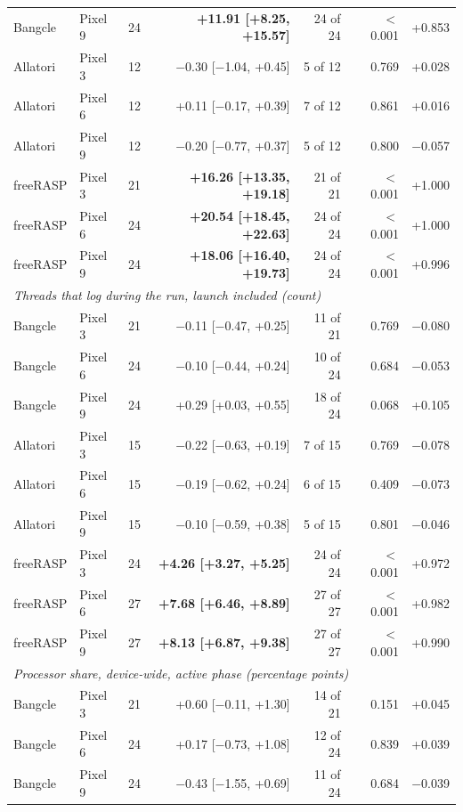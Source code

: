 \begin{table}[t]
\begin{tabular}{llrrrrr}
Bangcle & Pixel 9 & 24 & \textbf{+11.91 [+8.25, +15.57]} & 24 of 24 & $<$ 0.001 & +0.853 \\
Allatori & Pixel 3 & 12 & $-$0.30 [$-$1.04, +0.45] & 5 of 12 & 0.769 & +0.028 \\
Allatori & Pixel 6 & 12 & +0.11 [$-$0.17, +0.39] & 7 of 12 & 0.861 & +0.016 \\
Allatori & Pixel 9 & 12 & $-$0.20 [$-$0.77, +0.37] & 5 of 12 & 0.800 & $-$0.057 \\
freeRASP & Pixel 3 & 21 & \textbf{+16.26 [+13.35, +19.18]} & 21 of 21 & $<$ 0.001 & +1.000 \\
freeRASP & Pixel 6 & 24 & \textbf{+20.54 [+18.45, +22.63]} & 24 of 24 & $<$ 0.001 & +1.000 \\
freeRASP & Pixel 9 & 24 & \textbf{+18.06 [+16.40, +19.73]} & 24 of 24 & $<$ 0.001 & +0.996 \\
\midrule
\multicolumn{7}{l}{\textit{Threads that log during the run, launch included (count)}} \\
Bangcle & Pixel 3 & 21 & $-$0.11 [$-$0.47, +0.25] & 11 of 21 & 0.769 & $-$0.080 \\
Bangcle & Pixel 6 & 24 & $-$0.10 [$-$0.44, +0.24] & 10 of 24 & 0.684 & $-$0.053 \\
Bangcle & Pixel 9 & 24 & +0.29 [+0.03, +0.55] & 18 of 24 & 0.068 & +0.105 \\
Allatori & Pixel 3 & 15 & $-$0.22 [$-$0.63, +0.19] & 7 of 15 & 0.769 & $-$0.078 \\
Allatori & Pixel 6 & 15 & $-$0.19 [$-$0.62, +0.24] & 6 of 15 & 0.409 & $-$0.073 \\
Allatori & Pixel 9 & 15 & $-$0.10 [$-$0.59, +0.38] & 5 of 15 & 0.801 & $-$0.046 \\
freeRASP & Pixel 3 & 24 & \textbf{+4.26 [+3.27, +5.25]} & 24 of 24 & $<$ 0.001 & +0.972 \\
freeRASP & Pixel 6 & 27 & \textbf{+7.68 [+6.46, +8.89]} & 27 of 27 & $<$ 0.001 & +0.982 \\
freeRASP & Pixel 9 & 27 & \textbf{+8.13 [+6.87, +9.38]} & 27 of 27 & $<$ 0.001 & +0.990 \\
\midrule
\multicolumn{7}{l}{\textit{Processor share, device-wide, active phase (percentage points)}} \\
Bangcle & Pixel 3 & 21 & +0.60 [$-$0.11, +1.30] & 14 of 21 & 0.151 & +0.045 \\
Bangcle & Pixel 6 & 24 & +0.17 [$-$0.73, +1.08] & 12 of 24 & 0.839 & +0.039 \\
Bangcle & Pixel 9 & 24 & $-$0.43 [$-$1.55, +0.69] & 11 of 24 & 0.684 & $-$0.039 \\

\end{tabular}
\end{table}
